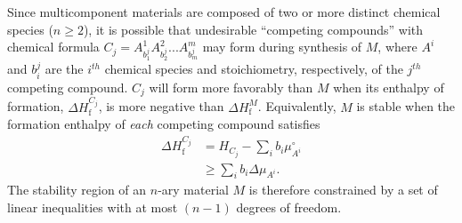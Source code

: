 \documentclass[%
 reprint,
 amsmath,amssymb,
 aps,
]{revtex4-1}
\begin{document}
Since multicomponent materials are composed of two or more distinct chemical species ($n \geq 2$), it is possible that undesirable ``competing compounds'' with chemical formula $C_j = A^1_{b^j_1} A^2_{b^j_2} ... A^m_{b^j_m}$ may form during synthesis of $M$, where $A^i$ and $b^j_i$ are the $i^{th}$ chemical species and stoichiometry, respectively, of the $j^{th}$ competing compound. $C_j$ will form more favorably than $M$ when its enthalpy of formation, $\Delta H^{C_j}_{\text{f}}$, is more negative than $\Delta H^{M}_{\text{f}}$. Equivalently, $M$ is stable when the formation enthalpy of \textit{each} competing compound satisfies
\begin{equation}
\begin{aligned}
\Delta H^{C_j}_{\text{f}} & = H_{C_j} - \sum_{i} b_i \mu^{\circ}_{A^i} \\
& \geq \sum_i b_i \Delta \mu_{A^i}.
\end{aligned}
\label{Equation:EnthalpyFormationCompeting}
\end{equation}
The stability region of an $n$-ary material $M$ is therefore constrained by a set of linear inequalities with at most $(n-1)$ degrees of freedom.

\end{document}
